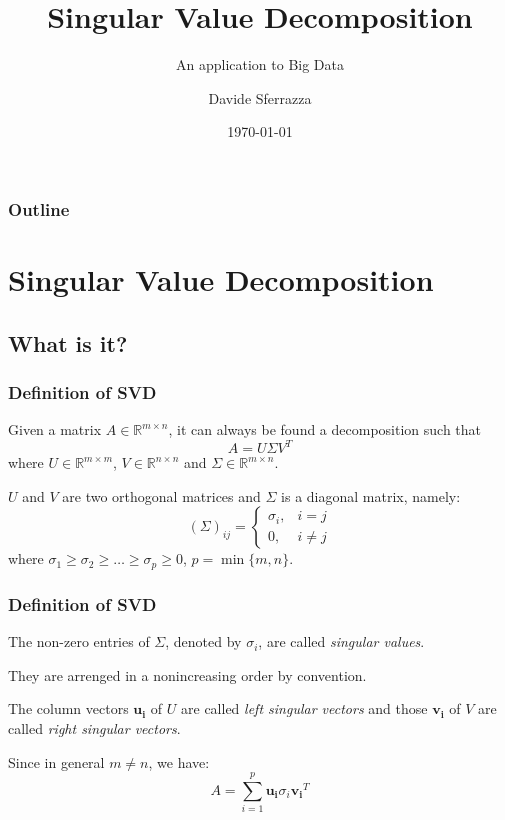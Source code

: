 \documentclass[10pt]{beamer}
\title{Singular Value Decomposition}
\subtitle{An application to Big Data}
\author{Davide Sferrazza}
\institute{Università degli Studi di Palermo}
\date{\today}
\begin{document}
\maketitle

\begin{frame}
    \frametitle{Outline}
    \tableofcontents
\end{frame}

\section{Singular Value Decomposition}
\subsection{What is it?}

\begin{frame}
    \frametitle{Definition of SVD}
    \begin{theorem}
        Given a matrix $A \in \mathbb{R}^{m \times n}$, it can always be found a decomposition such that
        \begin{equation}
            \label{eq:SVD}
            A = U \Sigma V^T
        \end{equation}
        where $U \in \mathbb{R}^{m \times m}$, $V \in \mathbb{R}^{n \times n}$ and $\Sigma \in \mathbb{R}^{m \times n}$.

        $U$ and $V$ are two orthogonal matrices and $\Sigma$ is a diagonal matrix, namely:
        $$ ( \Sigma )_{ij} = 
            \begin{cases}
                \sigma_i, & i = j \\
                0, & i \ne j 
            \end{cases} 
        $$
        where $\sigma_1 \ge \sigma_2 \ge \ldots  \ge \sigma_p \ge 0$, $p = \min\{m, n\}$.
    \end{theorem}
\end{frame}

\begin{frame}
    \frametitle{Definition of SVD}
    The non-zero entries of $\Sigma$, denoted by $\sigma_i$, are called \textit{singular values}.

    They are arrenged in a nonincreasing order by convention.

    The column vectors $\bm{u_i}$ of $U$ are called \textit{left singular vectors} and those $\bm{v_i}$ of $V$ are called \textit{right singular vectors}. \bigskip
    
    Since in general $m \ne n$, we have: 
    $$ A = \sum_{i = 1}^{p} \bm{u_i} \sigma_i \bm{v_i}^T $$

\end{frame}
\end{document}
